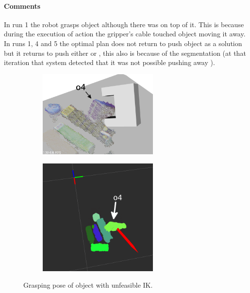 \paragraph{Comments}
In run 1 the robot grasps object  although there was  on top of it. This is because during the execution of   action the gripper's cable touched object  moving it away.  In runs 1, 4 and 5 the optimal plan does not return to push object  as a solution but it returns to push either  or , this also is because of the segmentation (at that iteration that system detected that it was not possible pushing away ). 


\begin{figure}[tb]
\centering
\begin{subfigure}[t]{0.45\textwidth}
\centering
\includegraphics[width=6cm]{Img/experiments/exp_good/grasp_o4.png}
\end{subfigure}
\begin{subfigure}[t]{0.45\textwidth}
\centering
\includegraphics[width=6cm]{Img/experiments/exp_good/grasp_o4_rviz.png}
\end{subfigure}
\caption{Grasping pose of object  with unfeasible IK.}\label{fig:grasp_o4}
\end{figure}

